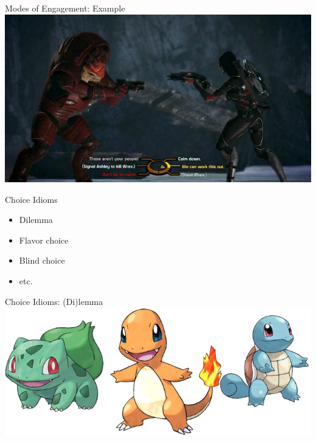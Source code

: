 \documentclass[xcolor=x11names]{beamer}
\begin{document}
\begin{frame}{Modes of Engagement: Example}
  \includegraphics[width=\textwidth]{res/me-choice-brighter.png}
\end{frame}

\begin{frame}{Choice Idioms}
  \begin{itemize}
    \item Dilemma
    \item Flavor choice
    \item Blind choice
    \item etc.
  \end{itemize}
\end{frame}

\begin{frame}{Choice Idioms: (Di)lemma}
  \includegraphics[width=\textwidth]{res/starter-pokemon.png}
\end{frame}
\end{document}
